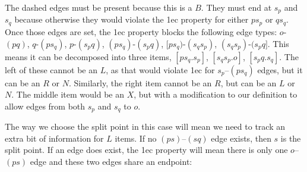\begin{center}
\end{center}

The dashed edges must be present because this is a $B$.
They must end at $s_p$ and $s_q$ because otherwise they would violate the 1ec property for either $ps_p$ or $qs_q$.
Once those edges are set, the 1ec property blocks the following edge types:
$o$-$(pq)$,
$q$-$(ps_q)$,
$p$-$(s_pq)$,
$(ps_q)$-$(s_pq)$,
$[ps_q)$-$(s_qs_p)$,
$(s_qs_p)$-$(s_pq]$.
This means it can be decomposed into three items, $[ps_q.s_p]$, $[s_qs_p.o]$, $[s_pq.s_q]$.
The left of these cannot be an $L$, as that would violate 1ec for $s_p$--$(ps_q)$ edges, but it can be an $R$ or $N$.
Similarly, the right item cannot be an $R$, but can be an $L$ or $N$.
The middle item would be an $X$, but with a modification to our definition to allow edges from both $s_p$ and $s_q$ to $o$.

\begin{center}
\end{center}

The way we choose the split point in this case will mean we need to track an extra bit of information for $L$ items.
If no $(ps)$--$(sq)$ edge exists, then $s$ is the split point.
If an edge does exist, the 1ec property will mean there is only one $o$--$(ps)$ edge and these two edges share an endpoint:

